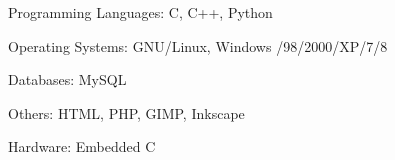 

\begin{cventries}

  \cventry
    {}{}{}{}
    {
      \begin{cvitems} %
        \item {Programming Languages: C, C++, Python}
        \item {Operating Systems: GNU/Linux, Windows /98/2000/XP/7/8}
        \item {Databases: MySQL}
        \item {Others: HTML, PHP, GIMP, Inkscape}
        \item {Hardware: Embedded C}
      \end{cvitems}
    }



\end{cventries}